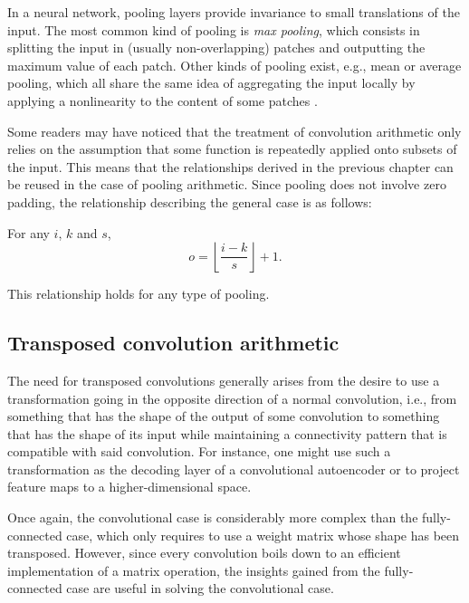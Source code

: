 In a neural network, pooling layers provide invariance to small translations of
the input. The most common kind of pooling is \emph{max pooling}, which
consists in splitting the input in (usually non-overlapping) patches and
outputting the maximum value of each patch. Other kinds of pooling exist, e.g.,
mean or average pooling, which all share the same idea of aggregating the input
locally by applying a nonlinearity to the content of some patches \citep{%
boureau-cvpr-10,boureau-icml-10,boureau-iccv-11,ICML2011Saxe_551}.

Some readers may have noticed that the treatment of convolution arithmetic only
relies on the assumption that some function is repeatedly applied onto subsets
of the input. This means that the relationships derived in the previous chapter
can be reused in the case of pooling arithmetic. Since pooling does not involve
zero padding, the relationship describing the general case is as follows:

\begin{relationship}\label{rel:pooling}
For any $i$, $k$ and $s$,
\begin{equation*}
    o = \left\lfloor \frac{i - k}{s} \right\rfloor + 1.
\end{equation*}
\end{relationship}

\noindent This relationship holds for any type of pooling.

\subsection{Transposed convolution arithmetic}

The need for transposed convolutions generally arises from the desire to use a
transformation going in the opposite direction of a normal convolution, i.e.,
from something that has the shape of the output of some convolution to
something that has the shape of its input while maintaining a connectivity
pattern that is compatible with said convolution. For instance, one might use
such a transformation as the decoding layer of a convolutional autoencoder or to
project feature maps to a higher-dimensional space.

Once again, the convolutional case is considerably more complex than the
fully-connected case, which only requires to use a weight matrix whose shape
has been transposed. However, since every convolution boils down to an
efficient implementation of a matrix operation, the insights gained from the
fully-connected case are useful in solving the convolutional case.

